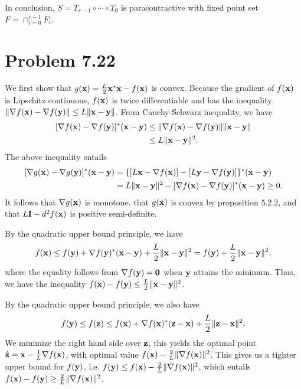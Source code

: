 \documentclass{scrartcl}
\begin{document}
In conclusion, $S = T_{r-1} \circ \cdots \circ T_0$ is paracontractive with fixed point set $F = \cap_{i=0}^{r-1} F_i$.



\section*{Problem 7.22}

We first show that $g(\mathbf{x}) = {L \over 2}  \mathbf{x}^*\mathbf{x} - f(\mathbf{x})$ is convex. Because the gradient of $f(\mathbf{x})$ is Lipschitz continuous, $f(\mathbf{x})$
is twice differentiable and has the inequality $\|\nabla f(\mathbf{x}) - \nabla f(\mathbf{y})\| \le L \| \mathbf{x} - \mathbf{y}\|$.
From Cauchy-Schwarz inequality, we have
\begin{equation}
\begin{split}
[\nabla f(\mathbf{x}) - \nabla f(\mathbf{y})]^*(\mathbf{x} - \mathbf{y})
& \le \|\nabla f(\mathbf{x}) - \nabla f(\mathbf{y})\| \| \mathbf{x} - \mathbf{y}\| \\
& \le L \| \mathbf{x} - \mathbf{y}\|^2.
\end{split}
\label{eqn:cauchy_22}
\end{equation}
The above inequality entails
\begin{equation}
\begin{split}
[\nabla g(\mathbf{x}) - \nabla g(\mathbf{y})]^*(\mathbf{x}-\mathbf{y})
& = \{[L\mathbf{x}-\nabla f(\mathbf{x})] - [L\mathbf{y}-\nabla f(\mathbf{y})]\}^*(\mathbf{x} - \mathbf{y}) \\
& = L\|\mathbf{x}-\mathbf{y}\|^2 - [\nabla f(\mathbf{x}) - \nabla f(\mathbf{y})]^*(\mathbf{x} - \mathbf{y}) \ge 0.
\end{split}
\end{equation}
It follows that $\nabla g(\mathbf{x})$ is monotone, that $g(\mathbf{x})$ is convex by proposition 5.2.2, and that $L \mathbf{I} - d^2 f(\mathbf{x})$ is positive semi-definite.

By the quadratic upper bound principle, we have
\begin{equation}
    f(\mathbf{x}) \le f(\mathbf{y}) + \nabla f(\mathbf{y})^*(\mathbf{x}-\mathbf{y}) + {L \over 2}\|\mathbf{x}-\mathbf{y}\|^2
    = f(\mathbf{y}) + {L \over 2}\|\mathbf{x}-\mathbf{y}\|^2,
    \label{eqn:qua_ub_22}
\end{equation}
where the equality follows from $\nabla f(\mathbf{y}) = \mathbf{0}$ when $\mathbf{y}$ attains the minimum. Thus, we have the inequality
$f(\mathbf{x})-f(\mathbf{y}) \le {L \over 2}\|\mathbf{x}-\mathbf{y}\|^2$.

By the quadratic upper bound principle, we also have
\begin{equation}
    f(\mathbf{y}) \le f(\mathbf{z}) \le f(\mathbf{x}) + \nabla f(\mathbf{x})^*(\mathbf{z}-\mathbf{x}) + {L \over 2}\|\mathbf{z}-\mathbf{x}\|^2.
\end{equation}
We minimize the right hand side over $\mathbf{z}$, this yields the optimal point $\hat{\mathbf{z}} = \mathbf{x} - {1 \over L} \nabla f(\mathbf{x})$, with optimal value
$f(\mathbf{x}) - {2 \over L}\|\nabla f(\mathbf{x})\|^2$. This gives us a tighter upper bound for $f(\mathbf{y})$, i.e.
$f(\mathbf{y}) \le f(\mathbf{x}) - {2 \over L}\|\nabla f(\mathbf{x})\|^2$, which entails $f(\mathbf{x}) - f(\mathbf{y}) \ge {2 \over L}\|\nabla f(\mathbf{x})\|^2$.
\end{document}
